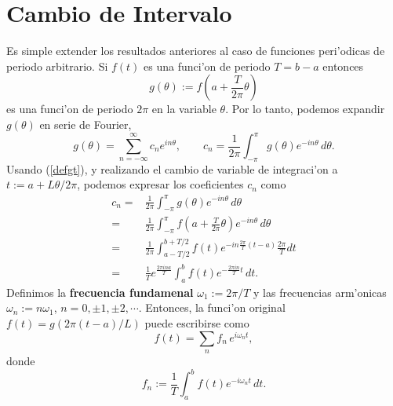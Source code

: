 \section{Cambio de Intervalo}
Es simple extender los resultados anteriores al caso de funciones peri'odicas de periodo arbitrario. Si $f(t)$ es una funci'on de periodo $T=b-a$ entonces
\begin{equation}\label{defgt}
g(\theta):=f(a+\frac{T}{2\pi}\theta)
\end{equation}
es una funci'on de periodo $2\pi$ en la variable $\theta$. Por lo tanto, podemos expandir $g(\theta)$ en serie de Fourier,
\begin{equation}\label{sfgt}
g(\theta)=\sum_{n=-\infty}^\infty c_n e^{i n\theta}, \qquad c_n =\frac{1}{2\pi}\int_{-\pi}^\pi g(\theta) e^{-in\theta}\,d\theta .
\end{equation}
Usando (\ref{defgt}), y realizando el cambio de variable de integraci'on a $t:=a+L\theta/2\pi$,  podemos expresar los coeficientes $c_n$ como
\begin{align}
c_n =& \frac{1}{2\pi}\int_{-\pi}^\pi g(\theta) e^{-in\theta}\,d\theta  \\
=& \frac{1}{2\pi}\int_{-\pi}^\pi f(a+\frac{T}{2\pi}\theta) e^{-in\theta}\,d\theta \\
=& \frac{1}{2\pi}\int_{a-T/2}^{b+T/2} f(t) e^{-in\frac{2\pi}{T}(t-a)}\frac{2\pi}{T}dt \\
=& \frac{1}{T}e^{\frac{2\pi ina}{T}}\int_a^b f(t) e^{-\frac{2\pi i n}{T}t}\,dt.
\end{align}
Definimos la \textbf{frecuencia fundamenal} $\omega_1:=2\pi/T$ y las frecuencias arm'onicas $\omega_n:=n\omega_1$, $n=0,\pm 1, \pm 2, \cdots$. Entonces, la funci'on original $f(t)=g(2\pi(t-a)/L)$ puede escribirse como
\begin{equation}\label{ftpT}
\boxed{f(t)=\sum_n f_n\, e^{i\omega_n t},}
\end{equation}
donde
\begin{equation}\label{fnpT}
\boxed{f_n:=\frac{1}{T}\int_a^b f(t) e^{-i\omega_n t}\,dt.}
\end{equation}

